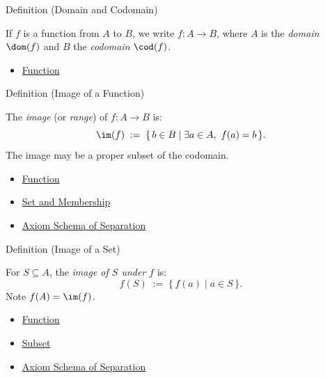 \begin{definitionbox}{Definition (Domain and Codomain)}
\begin{definition}\label{def:domain-codomain}
If $f$ is a function from $A$ to $B$, we write $f : A \to B$, where $A$ is
the \emph{domain} $\dom(f)$ and $B$ the \emph{codomain} $\cod(f)$.
\end{definition}
\end{definitionbox}

\begin{dependencies}
\begin{itemize}
  \item \hyperref[def:function]{Function}
\end{itemize}
\end{dependencies}

\begin{definitionbox}{Definition (Image of a Function)}
\begin{definition}\label{def:image-function}
The \emph{image} (or \emph{range}) of $f : A \to B$ is:
\[
\im(f) \;:=\; \{\, b \in B \mid \exists a \in A,\ f(a)=b \,\}.
\]
The image may be a proper subset of the codomain.
\end{definition}
\end{definitionbox}

\begin{dependencies}
\begin{itemize}
  \item \hyperref[def:function]{Function}
  \item \hyperref[def:set-membership]{Set and Membership}
  \item \hyperref[ax:separation]{Axiom Schema of Separation}
\end{itemize}
\end{dependencies}

\begin{definitionbox}{Definition (Image of a Set)}
\begin{definition}\label{def:image-set}
For $S \subseteq A$, the \emph{image of $S$ under $f$} is:
\[
f(S) \;:=\; \{\, f(a) \mid a \in S \,\}.
\]
Note $f(A) = \im(f)$.
\end{definition}
\end{definitionbox}

\begin{dependencies}
\begin{itemize}
  \item \hyperref[def:function]{Function}
  \item \hyperref[def:subset]{Subset}
  \item \hyperref[ax:separation]{Axiom Schema of Separation}
\end{itemize}
\end{dependencies}

